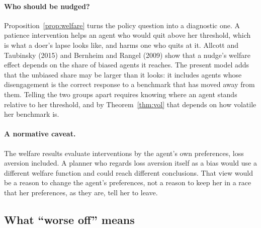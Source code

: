 \documentclass[12pt]{article}
\theoremstyle{definition}
\theoremstyle{remark}
\theoremstyle{plain}
\theoremstyle{definition}
\begin{document}
\paragraph{Who should be nudged?} Proposition~\ref{prop:welfare} turns the policy question into a diagnostic one. A patience intervention helps an agent who would quit above her threshold, which is what a doer's lapse looks like, and harms one who quits at it. Allcott and Taubinsky (2015) and Bernheim and Rangel (2009) show that a nudge's welfare effect depends on the share of biased agents it reaches. The present model adds that the unbiased share may be larger than it looks: it includes agents whose disengagement is the correct response to a benchmark that has moved away from them. Telling the two groups apart requires knowing where an agent stands relative to her threshold, and by Theorem~\ref{thm:vol} that depends on how volatile her benchmark is.

\paragraph{A normative caveat.} The welfare results evaluate interventions by the agent's own preferences, loss aversion included. A planner who regards loss aversion itself as a bias would use a different welfare function and could reach different conclusions. That view would be a reason to change the agent's preferences, not a reason to keep her in a race that her preferences, as they are, tell her to leave.

\subsection{What ``worse off'' means}\label{sec:worse}
\end{document}
